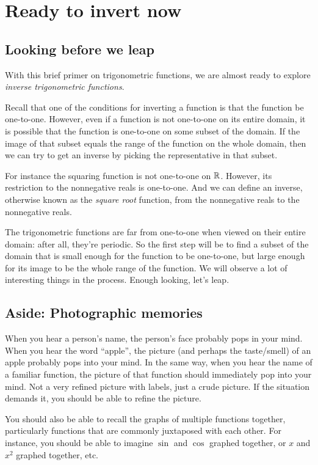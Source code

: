 \documentclass{amsart}
\begin{document}
\section{Ready to invert now}

\subsection{Looking before we leap}

With this brief primer on trigonometric functions, we are almost ready
to explore {\em inverse trigonometric functions}.

Recall that one of the conditions for inverting a function is that the
function be one-to-one. However, even if a function is not one-to-one
on its entire domain, it is possible that the function is one-to-one
on some subset of the domain. If the image of that subset equals the
range of the function on the whole domain, then we can try to get an
inverse by picking the representative in that subset.

For instance the squaring function is not one-to-one on $\mathbb{R}$. However,
its restriction to the nonnegative reals is one-to-one. And we can
define an inverse, otherwise known as the {\em square root} function,
from the nonnegative reals to the nonnegative reals.

The trigonometric functions are far from one-to-one when viewed on
their entire domain: after all, they're periodic. So the first step
will be to find a subset of the domain that is small enough for the
function to be one-to-one, but large enough for its image to be the
whole range of the function. We will observe a lot of interesting
things in the process. Enough looking, let's leap.

\subsection*{Aside: Photographic memories}

When you hear a person's name, the person's face probably pops in your
mind. When you hear the word ``apple'', the picture (and perhaps the
taste/smell) of an apple probably pops into your mind. In the same
way, when you hear the name of a familiar function, the picture of
that function should immediately pop into your mind. Not a very
refined picture with labels, just a crude picture. If the situation
demands it, you should be able to refine the picture.

You should also be able to recall the graphs of multiple functions
together, particularly functions that are commonly juxtaposed with
each other. For instance, you should be able to imagine $\sin$ and
$\cos$ graphed together, or $x$ and $x^2$ graphed together, etc.
\end{document}
